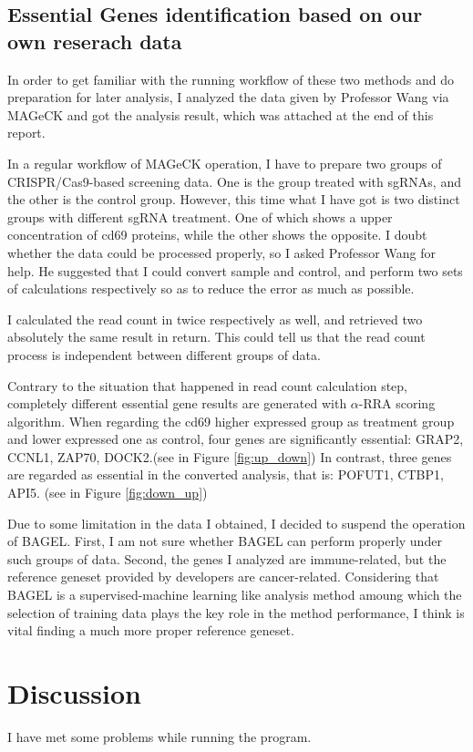 \documentclass[fleqn,10pt]{wlscirep}
\begin{document}
\subsection*{Essential Genes identification based on our own reserach data}
In order to get familiar with the running workflow of these two methods and do preparation for later analysis, I analyzed the data given by Professor Wang via MAGeCK and got the analysis result, which was attached at the end of this report. 

In a regular workflow of MAGeCK operation, I have to prepare two groups of CRISPR/Cas9-based screening data.  One is the group treated with sgRNAs, and the other is the control group.  However, this time what I have got is two distinct groups with different sgRNA treatment.  One of which shows a upper concentration of cd69 proteins, while the other shows the opposite.  I doubt whether the data could be processed properly, so I asked Professor Wang for help.  He suggested that I could convert sample and control, and perform two sets of calculations respectively so as to reduce the error as much as possible. 

I calculated the read count in twice respectively as well, and retrieved two absolutely the same result in return.  This could tell us that the read count process is independent between different groups of data.

Contrary to the situation that happened in read count calculation step, completely different essential gene results are generated with $\alpha$-RRA scoring algorithm.  When regarding the cd69 higher expressed group as treatment group and lower expressed one as control, four genes are significantly essential: GRAP2, CCNL1, ZAP70, DOCK2.(see in Figure \ref{fig:up_down})  In contrast, three genes are regarded as essential in the converted analysis, that is: POFUT1, CTBP1, API5. (see in Figure \ref{fig:down_up}) 

Due to some limitation in the data I obtained, I decided to suspend the operation of BAGEL.  First, I am not sure whether BAGEL can perform properly under such groups of data.  Second, the genes I analyzed are immune-related, but the reference geneset provided by developers are cancer-related.  Considering that BAGEL is a supervised-machine learning like analysis method amoung which the selection of training data plays the key role in the method performance, I think is vital finding a much more proper reference geneset.


\section*{Discussion}
I have met some problems while running the program.
\end{document}
